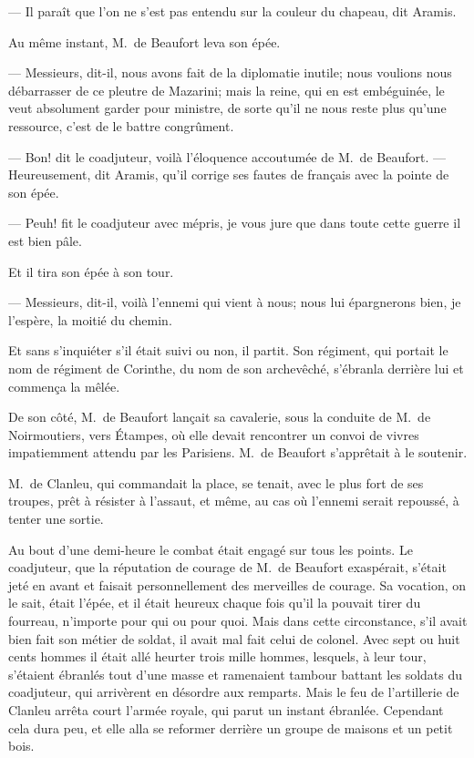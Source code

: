 — Il paraît que l'on ne s'est pas entendu sur la couleur du chapeau, dit Aramis.

Au même instant, M.~de Beaufort leva son épée.

— Messieurs, dit-il, nous avons fait de la diplomatie inutile; nous voulions nous débarrasser de ce pleutre de Mazarini; mais la reine, qui en est embéguinée, le veut absolument garder pour ministre, de sorte qu'il ne nous reste plus qu'une ressource, c'est de le battre congrûment.

— Bon! dit le coadjuteur, voilà l'éloquence accoutumée de M.~de Beaufort.
— Heureusement, dit Aramis, qu'il corrige ses fautes de français avec la pointe de son épée.

— Peuh! fit le coadjuteur avec mépris, je vous jure que dans toute cette guerre il est bien pâle.

Et il tira son épée à son tour.

— Messieurs, dit-il, voilà l'ennemi qui vient à nous; nous lui épargnerons bien, je l'espère, la moitié du chemin.

Et sans s'inquiéter s'il était suivi ou non, il partit. Son régiment, qui portait le nom de régiment de Corinthe, du nom de son archevêché, s'ébranla derrière lui et commença la mêlée.

De son côté, M.~de Beaufort lançait sa cavalerie, sous la conduite de M.~de Noirmoutiers, vers Étampes, où elle devait rencontrer un convoi de vivres impatiemment attendu par les Parisiens. M.~de Beaufort s'apprêtait à le soutenir.

M.~de Clanleu, qui commandait la place, se tenait, avec le plus fort de ses troupes, prêt à résister à l'assaut, et même, au cas où l'ennemi serait repoussé, à tenter une sortie.

Au bout d'une demi-heure le combat était engagé sur tous les points. Le coadjuteur, que la réputation de courage de M.~de Beaufort exaspérait, s'était jeté en avant et faisait personnellement des merveilles de courage. Sa vocation, on le sait, était l'épée, et il était heureux chaque fois qu'il la pouvait tirer du fourreau, n'importe pour qui ou pour quoi. Mais dans cette circonstance, s'il avait bien fait son métier de soldat, il avait mal fait celui de colonel. Avec sept ou huit cents hommes il était allé heurter trois mille hommes, lesquels, à leur tour, s'étaient ébranlés tout d'une masse et ramenaient tambour battant les soldats du coadjuteur, qui arrivèrent en désordre aux remparts. Mais le feu de l'artillerie de Clanleu arrêta court l'armée royale, qui parut un instant ébranlée. Cependant cela dura peu, et elle alla se reformer derrière un groupe de maisons et un petit bois.

